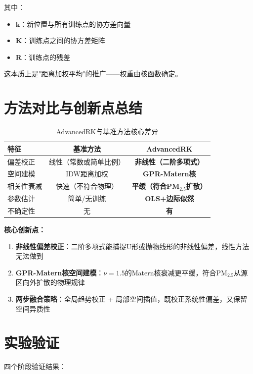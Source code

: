 \documentclass[UTF8, a4paper, 12pt]{article}
\begin{document}
其中：
\begin{itemize}
    \item $\mathbf{k}$：新位置与所有训练点的协方差向量
    \item $\mathbf{K}$：训练点之间的协方差矩阵
    \item $\mathbf{R}$：训练点的残差
\end{itemize}

这本质上是"距离加权平均"的推广——权重由核函数确定。

\section{方法对比与创新点总结}

\begin{table}[htbp]
\centering
\caption{AdvancedRK与基准方法核心差异}
\begin{tabular}{@{}lcc@{}}
\toprule
特征 & 基准方法 & AdvancedRK \\
\midrule
偏差校正 & 线性（常数或简单比例） & \textbf{非线性（二阶多项式）} \\
空间建模 & IDW距离加权 & \textbf{GPR-Matern核} \\
相关性衰减 & 快速（不符合物理） & \textbf{平缓（符合PM$_{2.5}$扩散）} \\
参数估计 & 简单/无训练 & \textbf{OLS+边际似然} \\
不确定性 & 无 & \textbf{有} \\
\end{tabular}
\end{table}

\textbf{核心创新点：}

\begin{enumerate}
    \item \textbf{非线性偏差校正}：二阶多项式能捕捉U形或抛物线形的非线性偏差，线性方法无法做到

    \item \textbf{GPR-Matern核空间建模}：$\nu=1.5$的Matern核衰减更平缓，符合PM$_{2.5}$从源区向外扩散的物理规律

    \item \textbf{两步融合策略}：全局趋势校正 + 局部空间插值，既校正系统性偏差，又保留空间异质性
\end{enumerate}

\section{实验验证}

四个阶段验证结果：
\end{document}
